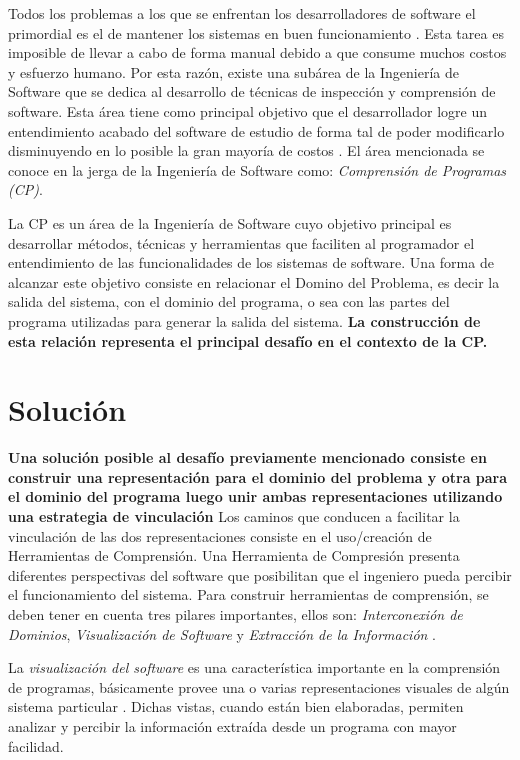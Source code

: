 \documentclass[12pt]{report}
\begin{document}
Todos los problemas a los que se enfrentan los desarrolladores de software el primordial es el de mantener los sistemas en buen funcionamiento \cite{VMAVA95}. 
Esta tarea es imposible de llevar a cabo de forma manual debido a que consume 
muchos costos y esfuerzo humano. 
Por esta razón, existe una subárea de la Ingeniería de Software que se  
dedica al desarrollo de técnicas de inspección y comprensión de software. 
Esta área tiene como principal objetivo que el desarrollador logre un entendimiento 
acabado del software de estudio de forma tal de poder modificarlo disminuyendo en lo posible la gran mayoría de costos \cite{BRM10}. 
El área mencionada se conoce en la jerga de la Ingeniería de Software como: 
\textit{Comprensión de Programas (CP)}.


La CP es un área de la Ingeniería de Software cuyo objetivo 
principal es desarrollar métodos, técnicas y herramientas que faciliten al programador 
el entendimiento de las funcionalidades de los sistemas de software.
Una forma de alcanzar este objetivo consiste en relacionar el Domino del Problema, 
es decir la salida del sistema, con el dominio del programa, o sea 
con las partes del programa utilizadas para generar la salida del sistema.
\textbf{La construcción de esta relación representa el principal desafío en el contexto de la CP.}



\section{Solución}

\textbf{Una solución posible al desafío previamente mencionado consiste en construir una representación para el dominio del problema y otra para el dominio del programa luego unir ambas representaciones utilizando una estrategia de vinculación} 
Los caminos que conducen a facilitar la vinculación de las dos representaciones consiste en el uso/creación de Herramientas de Comprensión. 
Una Herramienta de Compresión presenta diferentes perspectivas del software que posibilitan que el ingeniero pueda percibir el funcionamiento del sistema. 
Para construir herramientas de comprensión, se deben tener en cuenta tres pilares importantes, ellos son: \textit{Interconexión de Dominios}, 
\textit{Visualización de Software} y 
\textit{Extracción de la Información} \cite{STOREY99,BROOK82}.

La \textit{visualización del software} es una característica importante en la comprensión de programas, básicamente provee una o varias representaciones visuales de algún sistema particular \cite{BRM10}.
Dichas vistas, cuando están bien elaboradas, permiten analizar y percibir la información extraída desde un programa con mayor facilidad.
\end{document}
